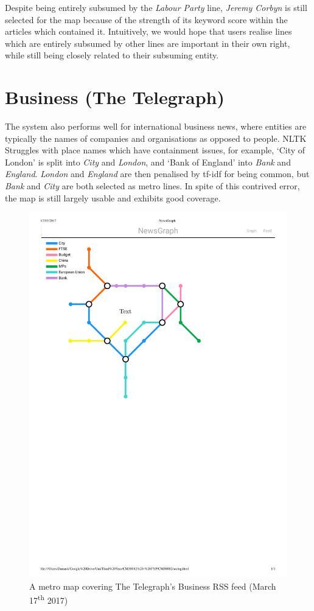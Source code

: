 Despite being entirely subsumed by the \textit{Labour Party} line, \textit{Jeremy Corbyn} is still selected for the map because of the strength of its keyword score within the articles which contained it. Intuitively, we would hope that users realise lines which are entirely subsumed by other lines are important in their own right, while still being closely related to their subsuming entity.

\section{Business (The Telegraph) \label{sec:business}}

The system also performs well for international business news, where entities are typically the names of companies and organisations as opposed to people. NLTK Struggles with place names which have containment issues, for example, `City of London' is split into \textit{City} and \textit{London}, and `Bank of England' into \textit{Bank} and \textit{England}. \textit{London} and \textit{England} are then penalised by tf-idf for being common, but  \textit{Bank} and \textit{City} are both selected as metro lines. In spite of this contrived error, the map is still largely usable and exhibits good coverage.
\begin{figure}[htbp!]
	\centering
	\includegraphics[width=.9\textwidth]{img/results/telegraph-business-tfidf.pdf}
	\caption{A metro map covering The Telegraph's Business RSS feed (March 17\textsuperscript{th} 2017)}
	\label{fig:telegraph-business}
\end{figure}

